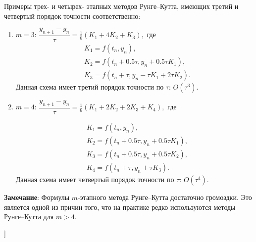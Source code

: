 Примеры трех- и четырех- этапных методов Рунге--Кутта, имеющих третий и четвертый порядок точности соответственно:
%

\begin{enumerate}
%
    \item \textbf{$m=3$}: $\dfrac{y_{n+1} - y_n}{\tau} = \frac16(K_1 + 4K_2 + K_3),$ где
    $$
        \begin{aligned}
            &K_1 = f(t_n, y_n), \\
            &K_2 = f(t_n + 0.5 \tau, y_n + 0.5 \tau K_1), \\
            &K_3 = f(t_n + \tau, y_n - \tau K_1 + 2\tau K_2).
        \end{aligned}
    $$
    Данная схема имеет третий порядок точности по $\tau$: $O(\tau^3)$.

    \item \textbf{$m=4$}: $\dfrac{y_{n+1} - y_n}{\tau} = \frac16 (K_1 + 2K_2 + 2K_3 + K_4),$ где
    
    $$
        \begin{aligned}
            &K_1 = f(t_n, y_n), \\
            &K_2 = f(t_n+0.5\tau, y_n + 0.5\tau K_1), \\
            &K_3 = f(t_n + 0.5 \tau, y_n + 0.5 \tau K_2), \\
            &K_4 = f(t_n + \tau, y_n + \tau K_3).
        \end{aligned}
    $$
    Данная схема имеет четвертый порядок точности по $\tau$: $O(\tau^4)$.

\end{enumerate}

%
\textbf{Замечание}: Формулы $m$-этапного метода Рунге--Кутта достаточно громоздки. Это является одной из причин того, что на практике редко используются методы Рунге--Кутта для $m > 4$.
%




\bigbreak
[\cite[page 152-163]{chimi}]
